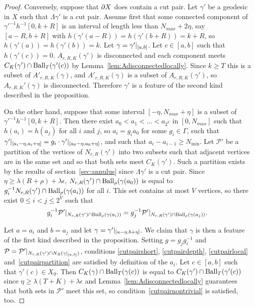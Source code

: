 \begin{proof}
Conversely, suppose that $\partial X$ does contain a cut pair. Let $\gamma'$
be a geodesic in $X$ such that $\Lambda\gamma'$ is a cut pair. Assume first
that some connected component of $\gamma'^{-1} h^{-1}[0, k + R]$ is an interval of length
less than $N_{max} + 2\eta$, say $[a - R, b + R]$ with $h(\gamma'(a - R)) =
h(\gamma'(b + R)) = k + R$, so $h(\gamma'(a)) = h(\gamma'(b)) = k$. Let $\gamma
= \gamma' \vert_{[a, b]}$.  Let $c \in [a, b]$ such that $h(\gamma'(c)) =
0$.  $A_{r, R, K}(\gamma')$ is disconnected and each component meets
$C_K(\gamma') \cap \operatorname{\mathrm{Ball}}_T(\gamma'(c))$ by
Lemma~\ref{lem:Adisconnectedlocally}. Since $k \geq T$ this is a subset of
$A'_{r, R, K}(\gamma)$, and $A'_{r, R, K}(\gamma)$ is  a subset of $A_{r, R,
K}(\gamma')$, so $A_{r, R, K}'(\gamma)$ is disconnected. Therefore $\gamma'$ is
a feature of the second kind described in the proposition.

On the other hand, suppose that some interval $[-\eta, N_{max} + \eta]$ is a
subset of $\gamma'^{-1} h^{-1}[0, k + R]$. Then there exist $a_0 < a_1 < \dots
< a_{2^V}$ in $[0, N_{max}]$ such that $h(a_i) = h(a_j)$ for all $i$ and $j$,
so $a_i = g_i a_0$ for some $g_i \in \Gamma$, such that
$\gamma'\vert_{[a_i - \eta, a_i + \eta]} = g_i \cdot
\gamma'\vert_{[a_0 - \eta, a_0 + \eta]}$, and such that $a_i - a_{i - 1}
\geq N_\text{min}$. Let $\mathcal{P}'$ be a partition of the vertices of $N_{r,
R}(\gamma')$ into two subsets such that adjacent vertices are in the same set
and so that both sets meet $C_K(\gamma')$. Such a partition
exists by the results of section~\ref{sec:annulus} since $\Lambda\gamma'$ is a
cut pair. Since $\eta \geq \lambda(R + \rho) + \lambda\epsilon$, $N_{r,
R}(\gamma') \cap \operatorname{\mathrm{Ball}}_\rho(\gamma(a_0))$ is equal to
$g_i^{-1} N_{r, R}(\gamma') \cap \operatorname{\mathrm{Ball}}_\rho(\gamma(a_i))$ for all $i$.
This set contains at most $V$ vertices, so there exist $0 \leq i < j \leq 2^V$
such that
\begin{align*}
g_i^{-1}\mathcal{P}'\vert_{N_{r, R}(\gamma') \cap
  \operatorname{\mathrm{Ball}}_\rho(\gamma(a_i))} = g_j^{-1}\mathcal{P}'\vert_{N_{r, R}(\gamma')
  \cap \operatorname{\mathrm{Ball}}_\rho(\gamma(a_j))}.
\end{align*}

Let $a = a_i$ and $b = a_j$ and let $\gamma = \gamma'\vert_{[a - \eta, b +
\eta]}$. We claim that $\gamma$ is then a feature of the first kind described
in the proposition. Setting $g = g_jg_i^{-1}$ and $\mathcal{P} =
\mathcal{P}'\vert_{N_{r, R}(\gamma') \cap
N_R(\gamma\vert_{[a, b]})}$, conditions \ref{cutpairshort},
\ref{cutpairdepth}, \ref{cutpairlocal} and~\ref{cutpairpartition} are
satisfied by definition of the $a_i$. Let $c \in [a, b]$ such that $\gamma'(c) \in X_0$. Then
$C_K(\gamma) \cap \operatorname{\mathrm{Ball}}_T(\gamma(c))$ is equal to $C_K(\gamma')
\cap \operatorname{\mathrm{Ball}}_T(\gamma'(c))$ since $\eta \geq \lambda(T+K) +
\lambda\epsilon$ and Lemma~\ref{lem:Adisconnectedlocally} guarantees that
both sets in $\mathcal{P}'$ meet this set, so condition~\ref{cutpairnontrivial}
is satisfied, too.\end{proof}

